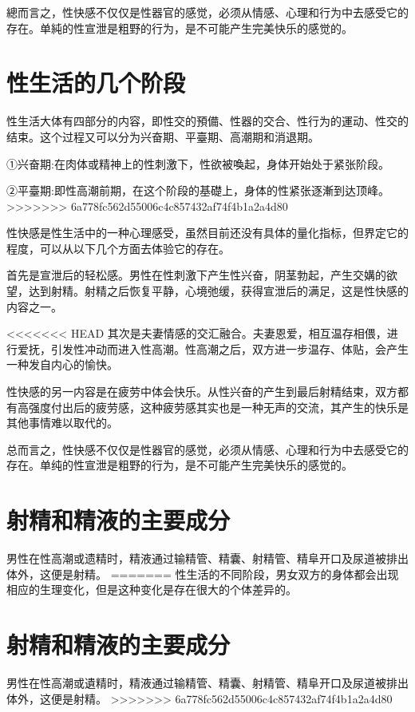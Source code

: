 \documentclass[12pt,UTF8]{ctexbook}
\begin{document}
總而言之，性快感不仅仅是性器官的感觉，必须从情感、心理和行为中去感受它的存在。单純的性宣泄是粗野的行为，是不可能产生完美快乐的感觉的。

\section{性生活的几个阶段}

性生活大体有四部分的内容，即性交的預備、性器的交合、性行为的運动、性交的结束。这个过程又可以分为兴奋期、平臺期、高潮期和消退期。

①兴奋期:在肉体或精神上的性刺激下，性欲被喚起，身体开始处于紧张阶段。

②平臺期:即性高潮前期，在这个阶段的基礎上，身体的性紧张逐漸到达顶峰。
>>>>>>> 6a778fc562d55006c4c857432af74f4b1a2a4d80

性快感是性生活中的一种心理感受，虽然目前还没有具体的量化指标，但界定它的程度，可以从以下几个方面去体验它的存在。

首先是宣泄后的轻松感。男性在性刺激下产生性兴奋，阴茎勃起，产生交媾的欲望，达到射精。射精之后恢复平静，心境弛缓，获得宣泄后的满足，这是性快感的内容之一。

<<<<<<< HEAD
其次是夫妻情感的交汇融合。夫妻恩爱，相互温存相偎，进行爱抚，引发性冲动而进入性高潮。性高潮之后，双方进一步温存、体贴，会产生一种发自内心的愉快。

性快感的另一内容是在疲劳中体会快乐。从性兴奋的产生到最后射精结束，双方都有高强度付出后的疲劳感，这种疲劳感其实也是一种无声的交流，其产生的快乐是其他事情难以取代的。

总而言之，性快感不仅仅是性器官的感觉，必须从情感、心理和行为中去感受它的存在。单纯的性宣泄是粗野的行为，是不可能产生完美快乐的感觉的。

\section{射精和精液的主要成分}

男性在性高潮或遗精时，精液通过输精管、精囊、射精管、精阜开口及尿道被排出体外，这便是射精。
=======
性生活的不同阶段，男女双方的身体都会出现相应的生理变化，但是这种变化是存在很大的个体差异的。

\section{射精和精液的主要成分}

男性在性高潮或遺精时，精液通过输精管、精囊、射精管、精阜开口及尿道被排出体外，这便是射精。
>>>>>>> 6a778fc562d55006c4c857432af74f4b1a2a4d80
\end{document}
